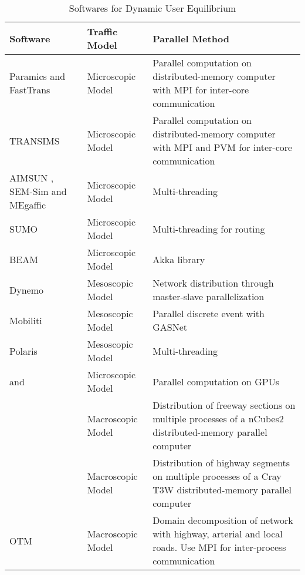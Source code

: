 \begin{table*}[htbp]
\centering
\begin{tabular} { | l | p{25mm} | p{80mm}| } 
	\hline
	\hline
	\textbf{Software} & \textbf{Traffic Model} & \textbf{Parallel Method}\\ \hline
	Paramics \cite{cameron1996paramics} and FastTrans \cite{thulasidasan2009accelerating}    & Microscopic Model & Parallel computation on distributed-memory computer with MPI for inter-core communication \\ \hline
	TRANSIMS \cite{robertson1969transyt}     & Microscopic Model & Parallel computation on distributed-memory computer with MPI and PVM for inter-core communication \\ \hline
	AIMSUN \cite{ferrer1993aimsun2}, SEM-Sim \cite{aydt2013multi} and MEgaffic \cite{osogami2012research}     & Microscopic Model & Multi-threading \\ \hline
	SUMO \cite{behrisch2011sumo}    & Microscopic Model & Multi-threading for routing \\ \hline
	BEAM \cite{aboutBeam}    & Microscopic Model & Akka library \\ \hline
	Dynemo \cite{nokel2002parallel}  & Mesoscopic Model & Network distribution through master-slave parallelization \\ \hline
	Mobiliti \cite{chan2018mobiliti}     & Mesoscopic Model & Parallel discrete event with GASNet \\ \hline
	Polaris \cite{auld2016polaris}     & Mesoscopic Model & Multi-threading \\ \hline
	\cite{xu2014mesoscopic,song2017supporting}and \cite{strippgen2009multi}     & Microscopic Model & Parallel computation on GPUs \\ \hline
	\cite{chronopoulos1998real}     & Macroscopic Model & Distribution of freeway sections on multiple processes of a nCubes2 distributed-memory parallel computer \\ \hline
	\cite{johnston1999parallelization}     & Macroscopic Model & Distribution of highway segments on multiple processes of a Cray T3W distributed-memory parallel computer \\ \hline
	OTM     & Macroscopic Model & Domain decomposition of network with highway, arterial and local roads. Use MPI for inter-process communication \\ \hline
\end{tabular}
\caption{Softwares for Dynamic User Equilibrium}
\label{tab:softwares}
\end{table*}

